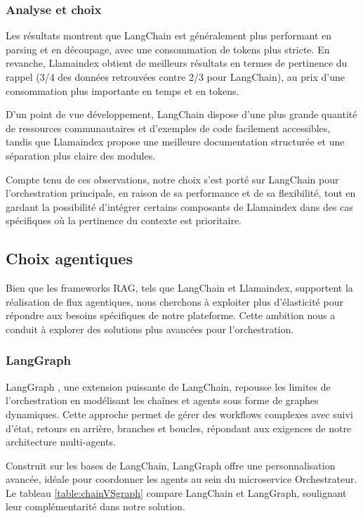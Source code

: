 \subsubsection{Analyse et choix}
Les résultats montrent que LangChain est généralement plus performant en parsing et en découpage, avec une consommation de tokens plus stricte. En revanche, Llamaindex obtient de meilleurs résultats en termes de pertinence du rappel (3/4 des données retrouvées contre 2/3 pour LangChain), au prix d’une consommation plus importante en temps et en tokens.

D’un point de vue développement, LangChain dispose d’une plus grande quantité de ressources communautaires et d’exemples de code facilement accessibles, tandis que Llamaindex propose une meilleure documentation structurée et une séparation plus claire des modules.

Compte tenu de ces observations, notre choix s’est porté sur LangChain pour l’orchestration principale, en raison de sa performance et de sa flexibilité, tout en gardant la possibilité d’intégrer certains composants de Llamaindex dans des cas spécifiques où la pertinence du contexte est prioritaire.  

\subsection{Choix agentiques}
Bien que les frameworks RAG, tels que LangChain et Llamaindex, supportent la réalisation de flux agentiques, nous cherchons à exploiter plus d'élasticité pour répondre aux besoins spécifiques de notre plateforme. Cette ambition nous a conduit à explorer des solutions plus avancées pour l’orchestration.
\subsubsection{LangGraph}
LangGraph \cite{langgraph}, une extension puissante de LangChain, repousse les limites de l’orchestration en modélisant les chaînes et agents sous forme de graphes dynamiques. Cette approche permet de gérer des workflows complexes avec suivi d’état, retours en arrière, branches et boucles, répondant aux exigences de notre architecture multi-agents.

Construit sur les bases de LangChain, LangGraph offre une personnalisation avancée, idéale pour coordonner les agents au sein du microservice Orchestrateur.
Le tableau \ref{table:chainVSgraph} compare LangChain et LangGraph, soulignant leur complémentarité dans notre solution.

